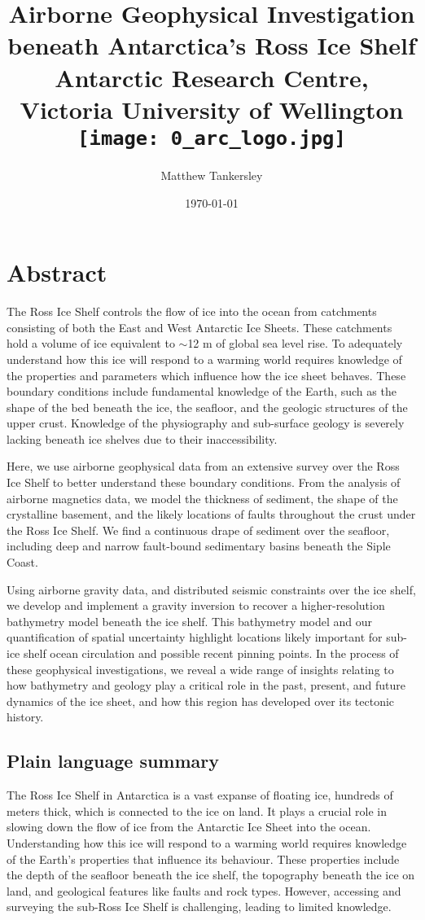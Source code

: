 \documentclass[12pt,twoside]{book}
\title{
{
Airborne Geophysical Investigation beneath Antarctica's Ross Ice Shelf
}\\



{\large Antarctic Research Centre, Victoria University of Wellington}\\
{\texttt{[image: 0\_arc\_logo.jpg]}}
}
\author{Matthew Tankersley}
\date{\today}
\begin{document}


\chapter*{Abstract}

The Ross Ice Shelf controls the flow of ice into the ocean from catchments consisting of both the East and West Antarctic Ice Sheets. These catchments hold a volume of ice equivalent to $\sim$12 m of global sea level rise. To adequately understand how this ice will respond to a warming world requires knowledge of the properties and parameters which influence how the ice sheet behaves. These boundary conditions include fundamental knowledge of the Earth, such as the shape of the bed beneath the ice, the seafloor, and the geologic structures of the upper crust. Knowledge of the physiography and sub-surface geology is severely lacking beneath ice shelves due to their inaccessibility. 

Here, we use airborne geophysical data from an extensive survey over the Ross Ice Shelf to better understand these boundary conditions. From the analysis of airborne magnetics data, we model the thickness of sediment, the shape of the crystalline basement, and the likely locations of faults throughout the crust under the Ross Ice Shelf. We find a continuous drape of sediment over the seafloor, including deep and narrow fault-bound sedimentary basins beneath the Siple Coast. 

Using airborne gravity data, and distributed seismic constraints over the ice shelf, we develop and implement a gravity inversion to recover a higher-resolution bathymetry model beneath the ice shelf. This bathymetry model and our quantification of spatial uncertainty highlight locations likely important for sub-ice shelf ocean circulation and possible recent pinning points. In the process of these geophysical investigations, we reveal a wide range of insights relating to how bathymetry and geology play a critical role in the past, present, and future dynamics of the ice sheet, and how this region has developed over its tectonic history. 


\section*{Plain language summary}

The Ross Ice Shelf in Antarctica is a vast expanse of floating ice, hundreds of meters thick, which is connected to the ice on land. It plays a crucial role in slowing down the flow of ice from the Antarctic Ice Sheet into the ocean. Understanding how this ice will respond to a warming world requires knowledge of the Earth's properties that influence its behaviour. These properties include the depth of the seafloor beneath the ice shelf, the topography beneath the ice on land, and geological features like faults and rock types. However, accessing and surveying the sub-Ross Ice Shelf is challenging, leading to limited knowledge. 
\end{document}
